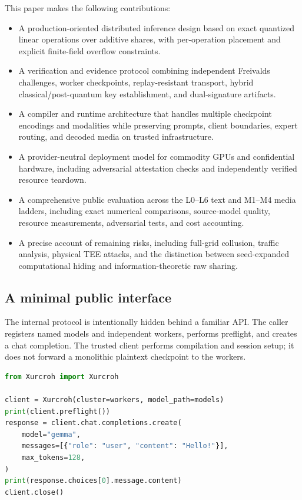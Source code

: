 This paper makes the following contributions:
\begin{itemize}
  \item A production-oriented distributed inference design based on exact quantized linear operations over additive shares, with per-operation placement and explicit finite-field overflow constraints.
  \item A verification and evidence protocol combining independent Freivalds challenges, worker checkpoints, replay-resistant transport, hybrid classical/post-quantum key establishment, and dual-signature artifacts.
  \item A compiler and runtime architecture that handles multiple checkpoint encodings and modalities while preserving prompts, client boundaries, expert routing, and decoded media on trusted infrastructure.
  \item A provider-neutral deployment model for commodity GPUs and confidential hardware, including adversarial attestation checks and independently verified resource teardown.
  \item A comprehensive public evaluation across the L0--L6 text and M1--M4 media ladders, including exact numerical comparisons, source-model quality, resource measurements, adversarial tests, and cost accounting.
  \item A precise account of remaining risks, including full-grid collusion, traffic analysis, physical TEE attacks, and the distinction between seed-expanded computational hiding and information-theoretic raw sharing.
\end{itemize}

\subsection{A minimal public interface}

The internal protocol is intentionally hidden behind a familiar API. The caller registers named models and independent workers, performs preflight, and creates a chat completion. The trusted client performs compilation and session setup; it does not forward a monolithic plaintext checkpoint to the workers.

\begin{lstlisting}[language=Python,caption={Public SDK entry point. The internal Fortress grid is selected by the model definition.},label=lst:sdk]
from Xurcroh import Xurcroh

client = Xurcroh(cluster=workers, model_path=models)
print(client.preflight())
response = client.chat.completions.create(
    model="gemma",
    messages=[{"role": "user", "content": "Hello!"}],
    max_tokens=128,
)
print(response.choices[0].message.content)
client.close()
\end{lstlisting}

